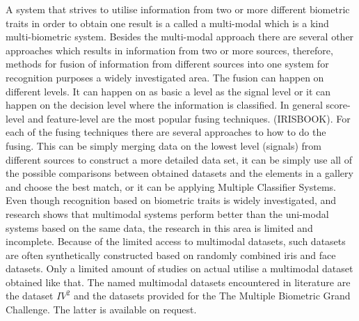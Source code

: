 


A system that strives to utilise information from two or more different biometric traits in order to obtain one result is a called a multi-modal which is a kind multi-biometric system. Besides the multi-modal approach there are several other approaches which results in information from two or more sources, therefore, methods for fusion of information from different sources into one system for recognition purposes a widely investigated area.  The fusion can happen on different levels. It can happen on as basic a level as the signal level or it can happen on the decision level where the information is classified. In general score-level and feature-level are the most popular fusing techniques. (IRISBOOK). For each of the fusing techniques there are several approaches to how to do the fusing. This can be simply merging data on the lowest level (signals) from different sources to construct a more detailed data set, it can be simply use all of the possible comparisons between obtained datasets and the elements in a gallery and choose the best match, or it can be applying Multiple Classifier Systems. 
Even though recognition based on biometric traits is widely investigated, and research shows that multimodal systems perform better than the uni-modal systems based on the same data, the research in this area is limited and incomplete. Because of the limited access to multimodal datasets, such datasets are often synthetically constructed based on randomly combined iris and face datasets. Only a limited amount of studies on actual utilise a multimodal dataset obtained like that. The named multimodal datasets encountered in literature are the dataset $IV^2$ and the datasets provided for the The Multiple Biometric Grand Challenge. The latter is available on request.  